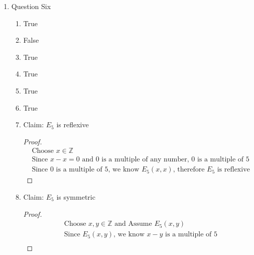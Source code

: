 \documentclass{article}
\begin{document}
\begin{enumerate}
\begin{enumerate}
\begin{proof}
\begin{align}
                &\text{Since } x \text{ is a multiple of } y \text{, there exists some } k \in \mathbb{N} \text{ such that } x = ky \\
                &\text{Since } y \text{ is a multiple of } z \text{, there exists some } j \in \mathbb{N} \text{ such that } y = jz \\
                &\text{Since } x = ky \text{ and } y = jz \text{, we know } x = kjz \\
                &\text{Let } n = kj \text{, such that } n \in \mathbb{N} \\
                &\text{Since } x = kjz \text{, we know } x = nz \\
                &\text{Since } x = nz \text{, we know } x \text{ is a multiple of } z \text{, so } M(x, z) \text{, therefore } M \text{ is transitive}
            \end{align}
        \end{proof}
    \end{enumerate}
    \item Question Six
    \begin{enumerate}
        \item True
        \item False
        \item True
        \item True
        \item True
        \item True
        \item
        Claim: $E_5$ is reflexive
        \begin{proof}
            \begin{align}
                &\text{Choose } x \in \mathbb{Z} \\
                &\text{Since } x - x = 0 \text{ and } 0 \text{ is a multiple of any number, } 0 \text{ is a multiple of } 5 \\
                &\text{Since } 0 \text{ is a multiple of } 5 \text{, we know } E_5(x, x) \text{, therefore } E_5 \text{ is reflexive}
            \end{align}
        \end{proof}
        \item
        Claim: $E_5$ is symmetric
        \begin{proof}
            \begin{align}
                &\text{Choose } x,y \in \mathbb{Z} \text{ and Assume } E_5(x, y) \\
                &\text{Since } E_5(x, y) \text{, we know } x - y \text{ is a multiple of } 5 \\

\end{align}
\end{proof}
\end{enumerate}
\end{enumerate}
\end{document}
